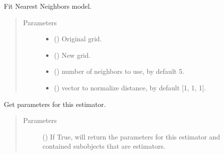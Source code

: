 \documentclass[letterpaper,10pt,english]{sphinxmanual}
\begin{document}
\begin{fulllineitems}
\begin{fulllineitems}
\label{\detokenize{api/properties_transfer:geology.models.PropertiesTransfer.fit}}
Fit Nearest Neighbors model.
\begin{quote}\begin{description}
\item[{Parameters}] \leavevmode\begin{itemize}
\item {} 
 () \textendash{} Original grid.

\item {} 
 () \textendash{} New grid.

\item {} 
 (\sphinxstyleliteralemphasis{\sphinxupquote{, }}) \textendash{} number of neighbors to use, by default 5.

\item {} 
 (\sphinxstyleliteralemphasis{\sphinxupquote{, }}) \textendash{} vector to normalize distance, by default {[}1, 1, 1{]}.

\end{itemize}

\end{description}\end{quote}

\end{fulllineitems}


\begin{fulllineitems}
\label{\detokenize{api/properties_transfer:geology.models.PropertiesTransfer.get_params}}
Get parameters for this estimator.
\begin{quote}\begin{description}
\item[{Parameters}] \leavevmode
{} (\sphinxstyleliteralemphasis{\sphinxupquote{, }}) \textendash{} If True, will return the parameters for this estimator and
contained subobjects that are estimators.


\end{description}
\end{quote}
\end{fulllineitems}
\end{fulllineitems}
\end{document}
